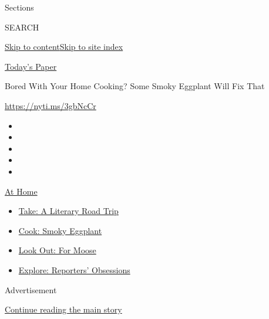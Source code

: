Sections

SEARCH

\protect\hyperlink{site-content}{Skip to
content}\protect\hyperlink{site-index}{Skip to site index}

\href{https://myaccount.nytimes3xbfgragh.onion/auth/login?response_type=cookie\&client_id=vi}{}

\href{https://www.nytimes3xbfgragh.onion/section/todayspaper}{Today's
Paper}

Bored With Your Home Cooking? Some Smoky Eggplant Will Fix That

\url{https://nyti.ms/3gbNcCr}

\begin{itemize}
\item
\item
\item
\item
\item
\end{itemize}

\href{https://www.nytimes3xbfgragh.onion/spotlight/at-home?action=click\&pgtype=Article\&state=default\&region=TOP_BANNER\&context=at_home_menu}{At
Home}

\begin{itemize}
\tightlist
\item
  \href{https://www.nytimes3xbfgragh.onion/2020/07/28/books/time-for-a-literary-road-trip.html?action=click\&pgtype=Article\&state=default\&region=TOP_BANNER\&context=at_home_menu}{Take:
  A Literary Road Trip}
\item
  \href{https://www.nytimes3xbfgragh.onion/2020/07/29/magazine/bored-with-your-home-cooking-some-smoky-eggplant-will-fix-that.html?action=click\&pgtype=Article\&state=default\&region=TOP_BANNER\&context=at_home_menu}{Cook:
  Smoky Eggplant}
\item
  \href{https://www.nytimes3xbfgragh.onion/2020/07/27/travel/moose-michigan-isle-royale.html?action=click\&pgtype=Article\&state=default\&region=TOP_BANNER\&context=at_home_menu}{Look
  Out: For Moose}
\item
  \href{https://www.nytimes3xbfgragh.onion/interactive/2020/at-home/even-more-reporters-editors-diaries-lists-recommendations.html?action=click\&pgtype=Article\&state=default\&region=TOP_BANNER\&context=at_home_menu}{Explore:
  Reporters' Obsessions}
\end{itemize}

Advertisement

\protect\hyperlink{after-top}{Continue reading the main story}

